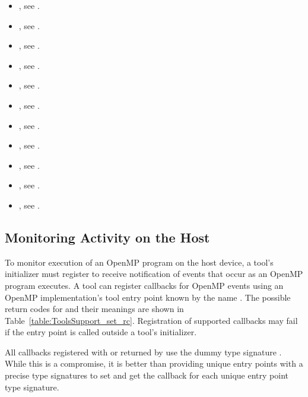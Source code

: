 \crossreferences
\begin{itemize}
\item {}, see .
\item {}, see
  .
\item {}, see .
\item {}, see .
\item {}, see .
\item {}, see .
\item {}, see .
\item {}, see .
\item {}, see .
\item {}, see .
\item {}, see
  .
\end{itemize}

\subsection{Monitoring Activity on the Host}
\label{sec:ompt-register-callbacks}

To monitor execution of an OpenMP program on the host device, a tool's
initializer must register to receive notification
of events that occur as an OpenMP program executes.  
A tool can register callbacks for OpenMP events using
an OpenMP implementation's tool entry point known by the name
.  The possible return codes for
 and their meanings are shown in
Table~\ref{table:ToolsSupport_set_rc}.  Registration of supported
callbacks may fail if the  entry point is
called outside a tool's initializer.

All callbacks registered with  or returned
by  use the dummy type signature
.  While this is a compromise, it is better
than providing unique entry points with a precise type signatures to
set and get the callback for each unique entry point type signature.

